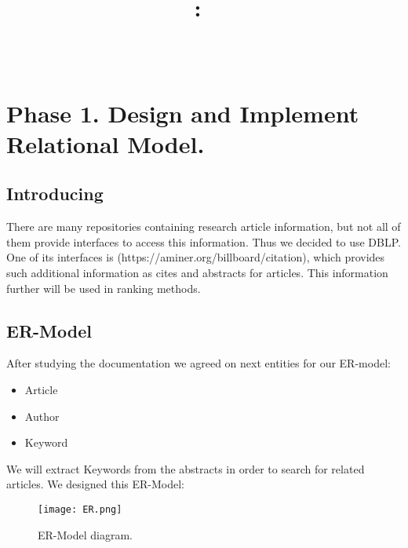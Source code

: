 \documentclass{article}
\title{
\vspace{2in}
\textmd{\textbf{\hmwkClass:\ \hmwkTitle}}\\
\vspace{0.1in}\large{\textit{\hmwkClassInstructor\ }}
\vspace{3in}
}
\author{\textbf{\hmwkAuthorName}}
\date{} %
\begin{document}
\maketitle



\newpage
\tableofcontents
\newpage

\section{Phase 1. Design and Implement Relational Model.}

\subsection{Introducing}
There are many repositories containing research article information, but not all of them provide interfaces to access this information. Thus we decided to use DBLP. One of its interfaces is (https://aminer.org/billboard/citation), which provides such additional information as cites and abstracts for articles. This information further will be used in ranking methods. 

\subsection{ER-Model}
After studying the documentation we agreed on next entities for our ER-model: 
\begin{itemize} 
	\item Article
	\item Author
	\item Keyword
\end{itemize} 
We will extract Keywords from the abstracts in order to search for related articles.
We designed this ER-Model:
\newline
\begin{figure}[h!]
  \centering
      \texttt{[image: ER.png]}
  \caption{ER-Model diagram.}
\end{figure}
\end{document}
